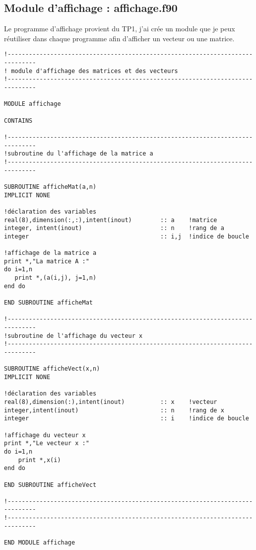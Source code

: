 \documentclass{report}
\begin{document}
\subsection{Module d'affichage : affichage.f90}
Le programme d'affichage provient du TP1, j'ai crée un module que je peux réutiliser
dans chaque programme afin d'afficher un vecteur ou une matrice.
\begin{small}
\begin{verbatim}
!------------------------------------------------------------------------------
! module d'affichage des matrices et des vecteurs
!------------------------------------------------------------------------------

MODULE affichage

CONTAINS

!------------------------------------------------------------------------------
!subroutine du l'affichage de la matrice a
!------------------------------------------------------------------------------

SUBROUTINE afficheMat(a,n)
IMPLICIT NONE

!déclaration des variables
real(8),dimension(:,:),intent(inout)        :: a    !matrice
integer, intent(inout)                      :: n    !rang de a
integer                                     :: i,j  !indice de boucle

!affichage de la matrice a
print *,"La matrice A :"
do i=1,n
   print *,(a(i,j), j=1,n)
end do

END SUBROUTINE afficheMat

!------------------------------------------------------------------------------
!subroutine de l'affichage du vecteur x
!------------------------------------------------------------------------------

SUBROUTINE afficheVect(x,n)
IMPLICIT NONE

!déclaration des variables
real(8),dimension(:),intent(inout)          :: x    !vecteur
integer,intent(inout)                       :: n    !rang de x
integer                                     :: i    !indice de boucle

!affichage du vecteur x
print *,"Le vecteur x :"
do i=1,n
    print *,x(i)
end do

END SUBROUTINE afficheVect

!------------------------------------------------------------------------------
!------------------------------------------------------------------------------

END MODULE affichage
\end{verbatim}
\end{small}
\end{document}

